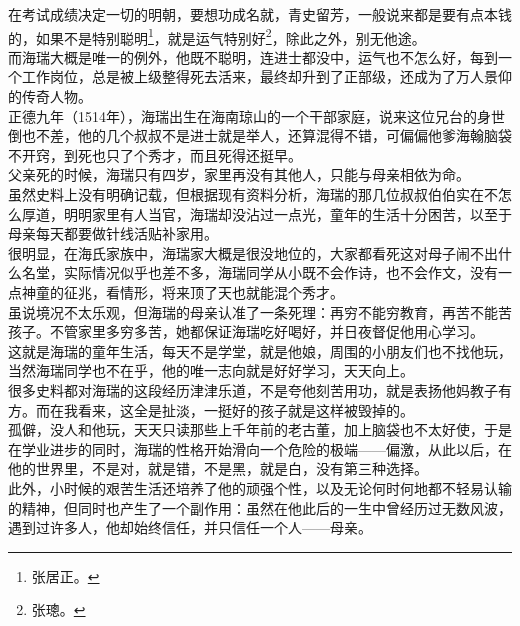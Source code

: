 \begin{multicols}{\theparacolNo}
在考试成绩决定一切的明朝，要想功成名就，青史留芳，一般说来都是要有点本钱的，如果不是特别聪明\footnote{张居正。}，就是运气特别好\footnote{张璁。}，除此之外，别无他途。\\

而海瑞大概是唯一的例外，他既不聪明，连进士都没中，运气也不怎么好，每到一个工作岗位，总是被上级整得死去活来，最终却升到了正部级，还成为了万人景仰的传奇人物。\\

正德九年（1514年），海瑞出生在海南琼山的一个干部家庭，说来这位兄台的身世倒也不差，他的几个叔叔不是进士就是举人，还算混得不错，可偏偏他爹海翰脑袋不开窍，到死也只了个秀才，而且死得还挺早。\\

父亲死的时候，海瑞只有四岁，家里再没有其他人，只能与母亲相依为命。\\

虽然史料上没有明确记载，但根据现有资料分析，海瑞的那几位叔叔伯伯实在不怎么厚道，明明家里有人当官，海瑞却没沾过一点光，童年的生活十分困苦，以至于母亲每天都要做针线活贴补家用。\\

很明显，在海氏家族中，海瑞家大概是很没地位的，大家都看死这对母子闹不出什么名堂，实际情况似乎也差不多，海瑞同学从小既不会作诗，也不会作文，没有一点神童的征兆，看情形，将来顶了天也就能混个秀才。\\

虽说境况不太乐观，但海瑞的母亲认准了一条死理：再穷不能穷教育，再苦不能苦孩子。不管家里多穷多苦，她都保证海瑞吃好喝好，并日夜督促他用心学习。\\

这就是海瑞的童年生活，每天不是学堂，就是他娘，周围的小朋友们也不找他玩，当然海瑞同学也不在乎，他的唯一志向就是好好学习，天天向上。\\

很多史料都对海瑞的这段经历津津乐道，不是夸他刻苦用功，就是表扬他妈教子有方。而在我看来，这全是扯淡，一挺好的孩子就是这样被毁掉的。\\

孤僻，没人和他玩，天天只读那些上千年前的老古董，加上脑袋也不太好使，于是在学业进步的同时，海瑞的性格开始滑向一个危险的极端——偏激，从此以后，在他的世界里，不是对，就是错，不是黑，就是白，没有第三种选择。\\

此外，小时候的艰苦生活还培养了他的顽强个性，以及无论何时何地都不轻易认输的精神，但同时也产生了一个副作用：虽然在他此后的一生中曾经历过无数风波，遇到过许多人，他却始终信任，并只信任一个人——母亲。\\


\end{multicols}
